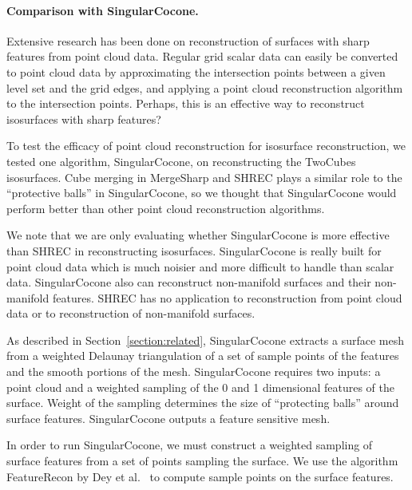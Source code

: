 \paragraph{Comparison with SingularCocone.}

Extensive research has been done on reconstruction of surfaces
with sharp features from point cloud data.
Regular grid scalar data can easily be converted to point cloud data
by approximating the intersection points 
between a given level set and the grid edges,
and applying a point cloud reconstruction algorithm to the intersection points.
Perhaps, this is an effective way to reconstruct isosurfaces 
with sharp features?

To test the efficacy of point cloud reconstruction
for isosurface reconstruction,
we tested one algorithm, SingularCocone,
on reconstructing the TwoCubes isosurfaces.
Cube merging in MergeSharp and SHREC plays a similar role
to the ``protective balls'' in SingularCocone,
so we thought that SingularCocone would perform
better than other point cloud reconstruction algorithms.

We note that we are only evaluating whether SingularCocone
is more effective than SHREC in reconstructing isosurfaces.
SingularCocone is really built for point cloud data
which is much noisier and more difficult to handle
than scalar data.
SingularCocone also can reconstruct non-manifold surfaces
and their non-manifold features.
SHREC has no application to reconstruction from point cloud data
or to reconstruction of non-manifold surfaces.

As described in Section~\ref{section:related},
SingularCocone extracts a surface mesh from a weighted Delaunay triangulation
of a set of sample points of the features and the smooth portions
of the mesh.
SingularCocone requires two inputs: 
a point cloud and a weighted sampling
of the 0 and 1 dimensional features of the surface.
Weight of the sampling determines the size of ``protecting balls''
around surface features.
SingularCocone outputs a feature sensitive mesh.

In order to run SingularCocone,
we must construct a weighted sampling of surface features
from a set of points sampling the surface.
We use the algorithm FeatureRecon by Dey et al.~\cite{Dey2013}
to compute sample points on the surface features.


